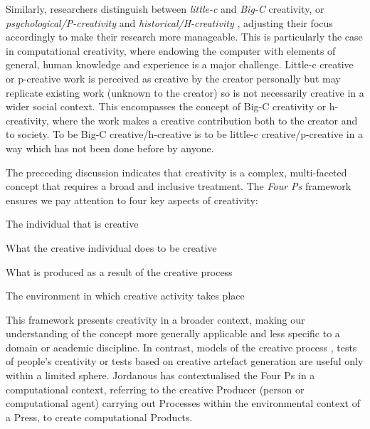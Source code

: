\documentclass[10pt,letterpaper]{article}
\begin{document}
Similarly, researchers distinguish between {\em little-c} and {\em Big-C} creativity, or {\em psychological/P-creativity} and  {\em historical/H-creativity} \cite{boden04}, adjusting their focus accordingly to make their research more manageable. This is particularly the case in computational creativity, where endowing the computer with elements of general, human knowledge and experience is a major challenge. Little-c creative or p-creative work is perceived as creative by the creator personally but may replicate existing work (unknown to the creator) so is not necessarily creative in a wider social context. This encompasses the concept of Big-C creativity or h-creativity, where the work makes a creative contribution both to the creator and to society. To be Big-C creative/h-creative is to be little-c creative/p-creative in a way which has not been done before by anyone.

The preceeding discussion indicates that creativity is a complex, multi-faceted concept that requires a broad and inclusive treatment. The {\em Four Ps} framework \cite{rhodes61,stein63,mooney63,odena09,jordanous16cs} ensures we pay attention to four key aspects of creativity:

\begin{description}
\setlength{\labelwidth}{1.5cm}
\setlength{\itemindent}{1.5cm}
\item[Person/Producer:] The individual that is creative
\item[Process:] What the creative individual does to be creative
\item[Product:] What is produced as a result of the creative process
\item[Press:] The environment in which creative activity takes place
\end{description}

\noindent This framework presents creativity in a broader context, making our understanding of the concept more generally applicable and less specific to a domain or academic discipline. In contrast, models of the creative process \cite{wallas26,poincare29,hadamard45}, tests of people's creativity \cite{goldman64,guilford67,torrance74} or tests based on creative artefact generation \cite{amabile96,ritchie07} are useful only within a limited sphere. Jordanous \cite{jordanous16cs} has contextualised the Four Ps in a computational context, referring to the creative Producer (person or computational agent) carrying out Processes within the environmental context of a Press, to create computational Products.
\end{document}

